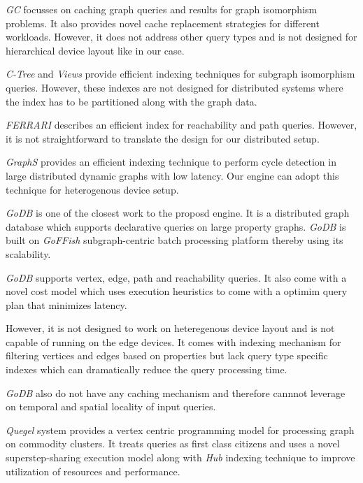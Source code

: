 \documentclass[conference]{IEEEtran}
\begin{document}
\emph{GC}\cite{enlighten130141} focusses on caching graph queries and results for graph isomorphism problems. It also provides novel cache replacement strategies for different workloads. However, it does not address other query types and is not designed for hierarchical device layout like in our case.

\emph{C-Tree}\cite{1617406} and \emph{Views}\cite{6816650} provide efficient indexing techniques for subgraph isomorphism queries. However, these indexes are not designed for distributed systems where the index has to be partitioned along with the graph data.

\emph{FERRARI}\cite{6544893} describes an efficient index for reachability and path queries. However, it is not straightforward to translate the design for our distributed setup.

\emph{GraphS}\cite{Qiu:2018:RCC:3229863.3275554} provides an efficient indexing technique to perform cycle detection in large distributed dynamic graphs with low latency. Our engine can adopt this technique for heterogenous device setup.  

\emph{GoDB}\cite{jamadagni:ccgrid:2016} is one of the closest work to the proposd engine. It is a distributed graph database which supports declarative queries on large property graphs. \emph{GoDB} is built on \emph{GoFFish} subgraph-centric batch processing platform thereby using its scalability.  

\emph{GoDB} supports vertex, edge, path and reachability queries. It also come with a novel cost model which uses execution heuristics to come with a optimim query plan that minimizes latency.

However, it is not designed to work on heteregenous device layout and is not capable of running on the edge devices. It comes with indexing mechanism for filtering vertices and edges based on properties but lack query type specific indexes which can dramatically reduce the query processing time.

\emph{GoDB} also do not have any caching mechanism and therefore cannnot leverage on temporal and spatial locality of input queries. 

\emph{Quegel}\cite{Yan:2016:GQF:2904483.2904488} system provides a vertex centric programming model for processing graph on commodity clusters. It treats queries as first class citizens and uses a novel superstep-sharing execution model along with \emph{Hub} indexing technique to improve utilization of resources and performance.
\end{document}
